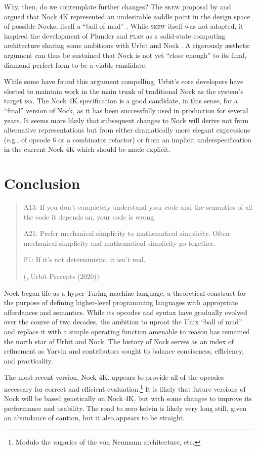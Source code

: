 \documentclass[twoside]{article}
\begin{document}
Why, then, do we contemplate further changes?  The \textsc{skew} proposal by  and  argued that Nock 4K represented an undesirable saddle point in the design space of possible Nocks, itself a ``ball of mud'' \citep{Skew2020}.  While \textsc{skew} itself was not adopted, it inspired the development of Plunder and \textsc{plan} as a solid-state computing architecture sharing some ambitions with Urbit and Nock \citep{Plunder2025}.  A rigorously æsthetic argument can thus be sustained that Nock is not yet ``close enough'' to its final, diamond-perfect form to be a viable candidate.

While some have found this argument compelling, Urbit's core developers have elected to maintain work in the main trunk of traditional Nock as the system's target \textsc{isa}.  The Nock 4K specification is a good candidate, in this sense, for a ``final'' version of Nock, as it has been successfully used in production for several years.  It seems more likely that subsequent changes to Nock will derive not from alternative representations but from either dramatically more elegant expressions (e.g., of \mbox{opcode} 6 or a combinator refactor) or from an \mbox{implicit} under\-specification in the current Nock 4K which should be made \mbox{explicit}.

\section{Conclusion}

\begin{quote}
A13:  If you don't completely understand your code and the semantics of all the code it depends on, your code is wrong.

A21: Prefer mechanical simplicity to mathematical simplicity.  Often mechanical simplicity and mathematical simplicity go together.

F1: If it's not deterministic, it isn't real.

(, Urbit Precepts (2020))
\end{quote}

Nock began life as a hyper-Turing machine language, a theoretical construct for the purpose of defining higher-level programming languages with appropriate affordances and semantics.  While its opcodes and syntax have gradually evolved over the course of two decades, the ambition to uproot the Unix ``ball of mud'' and replace it with a simple operating function amenable to reason has remained the north star of Urbit and Nock.  The history of Nock serves as an index of refinement as Yarvin and contributors sought to balance conciseness, efficiency, and practicality.

The most recent version, Nock 4K, appears to provide all of the opcodes necessary for correct and efficient evaluation.\footnote{Modulo the vagaries of the von Neumann architecture, etc.}  It is likely that future versions of Nock will be based genetically on Nock 4K, but with some changes to improve its performance and usability.  The road to zero kelvin is likely very long still, given an abundance of caution, but it also appears to be straight.

\printbibliography
\end{document}
